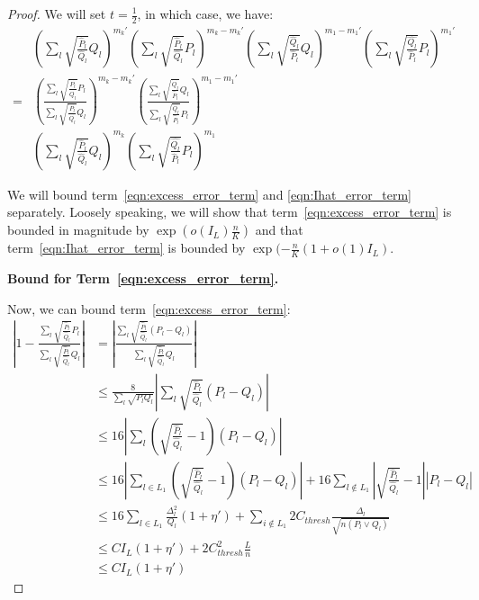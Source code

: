 \begin{proof}
We will set $t = \frac{1}{2}$, in which case, we have:
\begin{align}
& \left( \sum_l \sqrt{\frac{\hat{P}_l}{\hat{Q}_l} } Q_l \right)^{m_k'}
 \left( \sum_l \sqrt{\frac{\hat{P}_l}{\hat{Q}_l} } P_l \right)^{m_k - m_k'}
 \left( \sum_l \sqrt{\frac{\hat{Q}_l}{\hat{P}_l} } Q_l \right)^{m_1 - m_1'}
       \left( \sum_l \sqrt{\frac{\hat{Q_l}}{\hat{P}_l} } P_l \right)^{m_1'} \nonumber \\
=&  \left( \frac{\sum_l \sqrt{\frac{\hat{P}_l}{\hat{Q}_l} } P_l}
                {\sum_l \sqrt{\frac{\hat{P}_l}{\hat{Q}_l} } Q_l}  \right)^{m_k - m_k'}
 \left( \frac{ \sum_l \sqrt{\frac{\hat{Q}_l}{\hat{P}_l} } Q_l}
             { \sum_l \sqrt{\frac{\hat{Q}_l}{\hat{P}_l} } P_l} \right)^{m_1 - m_1'}  
   \label{eqn:excess_error_term} \\
 & \left( \sum_l \sqrt{ \frac{\hat{P}_l}{\hat{Q}_l}} Q_l \right)^{m_k} 
    \left( \sum_l \sqrt{\frac{\hat{Q_l}}{\hat{P}_l} } P_l \right)^{m_1}
   \label{eqn:Ihat_error_term} 
\end{align} 

We will bound term~\ref{eqn:excess_error_term} and \ref{eqn:Ihat_error_term} separately. Loosely speaking, we will show that term~\ref{eqn:excess_error_term} is bounded in magnitude by $\exp( o(I_L) \frac{n}{K} )$ and that term~\ref{eqn:Ihat_error_term} is bounded by $\exp( - \frac{n}{K} (1 + o(1) I_L)$. 


\textbf{Bound for Term~\ref{eqn:excess_error_term}.} 

Now, we can bound term~\ref{eqn:excess_error_term}:
\begin{align*}
\left| 1 -  \frac{\sum_l \sqrt{\frac{\hat{P}_l}{\hat{Q}_l} } P_l}
                {\sum_l \sqrt{\frac{\hat{P}_l}{\hat{Q}_l} } Q_l}  \right|
 &= \left| \frac{ \sum_l \sqrt{ \frac{\hat{P}_l}{\hat{Q}_l}} (P_l - Q_l) }
     { \sum_l \sqrt{ \frac{\hat{P}_l}{\hat{Q}_l}} Q_l } \right| \\
&\leq \frac{8}{\sum_l \sqrt{P_l Q_l}} 
     \left| \sum_l \sqrt{ \frac{\hat{P}_l}{\hat{Q}_l} }(P_l - Q_l) \right| \\
&\leq 16 \left|  \sum_{l} \left( \sqrt{ \frac{\hat{P}_l}{\hat{Q}_l} } - 1 \right) (P_l - Q_l)  \right| \\
&\leq 16 \left| 
     \sum_{l \in L_1} \left( \sqrt{\frac{\hat{P}_l}{\hat{Q}_l}} - 1 \right)(P_l - Q_l) 
     \right| + 16 \sum_{l \notin L_1} \left| \sqrt{ \frac{\hat{P}_l}{\hat{Q}_l}} - 1 \right| |P_l - Q_l| \\
&\leq 16 \sum_{l \in L_1} \frac{\Delta^2_l}{Q_l}(1+ \eta') + 
      \sum_{i \notin L_1} 2 C_{thresh} \frac{\Delta_l}{\sqrt{n (P_l \vee Q_l)}} \\
&\leq C I_L (1 + \eta') + 2 C_{thresh}^2 \frac{L}{n} \\
&\leq C I_L (1 + \eta')
\end{align*}



\end{proof}
